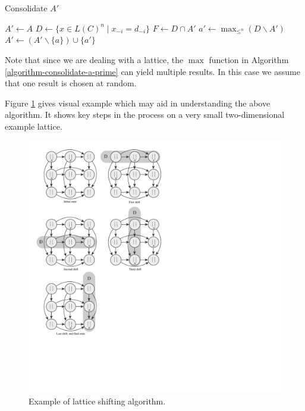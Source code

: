 	\begin{algorithm}
		\caption{Consolidate $A'$}
		\label{algorithm-consolidate-a-prime}
		\begin{algorithmic}
			\State $A' \gets A$
					\State $D \gets \{x \in L(C)^n \mid x_{-i} = d_{-i}\}$
					\State $F \gets D \cap A'$
						\State $a' \gets \max_{\le^n}(D \backslash A')$
						\State $A' \gets (A' \backslash \{a\}) \cup \{a'\}$ 
					\EndFor
				\EndFor
			\EndFor
		\end{algorithmic}
	\end{algorithm}

	Note that since we are dealing with a lattice, the $\max$ function in Algorithm \ref{algorithm-consolidate-a-prime} can yield multiple results. In this case we assume that one result is chosen at random.

	Figure \ref{figure-algorithm-example} gives visual example which may aid in understanding the above algorithm. It shows key steps in the process on a very small two-dimensional example lattice.

	\begin{figure}[ht]
		\begin{center}
			\includegraphics[width=4.6in]{../figures/diagram8.pdf}
			\caption{Example of lattice shifting algorithm.}
			\label{figure-algorithm-example}
		\end{center}
	\end{figure}

